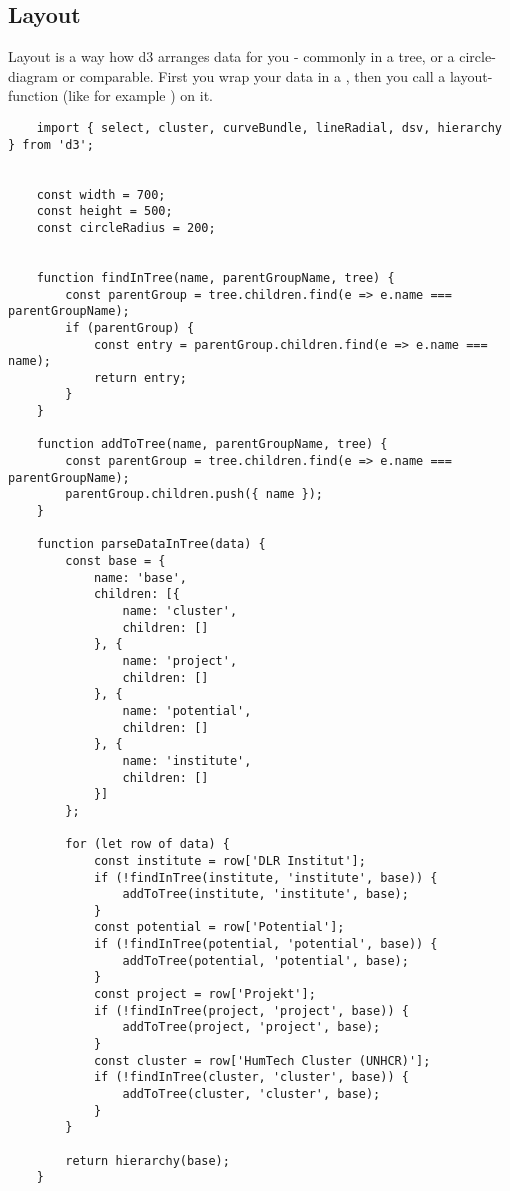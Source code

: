 {\subsection{Layout}
Layout is a way how d3 arranges data for you - commonly in a tree, or a circle-diagram or comparable. First you wrap your data in a , then you call a layout-function (like for example ) on it.
\begin{lstlisting}
    import { select, cluster, curveBundle, lineRadial, dsv, hierarchy } from 'd3';


    const width = 700;
    const height = 500;
    const circleRadius = 200;
    
    
    function findInTree(name, parentGroupName, tree) {
        const parentGroup = tree.children.find(e => e.name === parentGroupName);
        if (parentGroup) {
            const entry = parentGroup.children.find(e => e.name === name);
            return entry;
        }
    }
    
    function addToTree(name, parentGroupName, tree) {
        const parentGroup = tree.children.find(e => e.name === parentGroupName);
        parentGroup.children.push({ name });
    }
    
    function parseDataInTree(data) {
        const base = {
            name: 'base',
            children: [{
                name: 'cluster',
                children: []
            }, {
                name: 'project',
                children: []
            }, {
                name: 'potential',
                children: []
            }, {
                name: 'institute',
                children: []
            }]
        };
    
        for (let row of data) {
            const institute = row['DLR Institut'];
            if (!findInTree(institute, 'institute', base)) {
                addToTree(institute, 'institute', base);
            }
            const potential = row['Potential'];
            if (!findInTree(potential, 'potential', base)) {
                addToTree(potential, 'potential', base);
            }
            const project = row['Projekt'];
            if (!findInTree(project, 'project', base)) {
                addToTree(project, 'project', base);
            }
            const cluster = row['HumTech Cluster (UNHCR)'];
            if (!findInTree(cluster, 'cluster', base)) {
                addToTree(cluster, 'cluster', base);
            }
        }
    
        return hierarchy(base);
    }
    

\end{lstlisting}}
